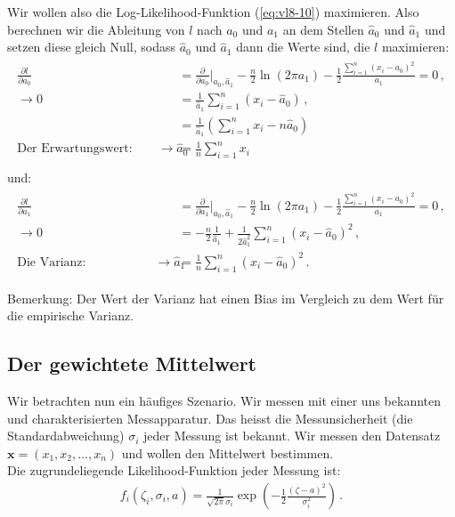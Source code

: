 Wir wollen also die Log-Likelihood-Funktion (\cref{eq:vl8-10}) maximieren. Also berechnen wir die Ableitung von $l$ nach $a_0$ und $a_1$ an dem Stellen $\hat{a}_0$ und $\hat{a}_1$ und setzen diese gleich Null, sodass $\hat{a}_0$ und $\hat{a}_1$ dann die Werte sind, die $l$ maximieren:
\begin{align}
\begin{split}
\frac{ \partial l }{ \partial a_0 } &= \frac{ \partial }{ \partial a_0 } \bigg|_{\hat{a}_0, \hat{a}_1} - \frac{n}{2} \ln{ ( 2 \pi a_1 ) } - \frac{1}{2} \frac{ \sum_{i=1}^n (x_i - a_0)^2 }{ a_1 } = 0\,,\\
\rightarrow 0 &= \frac{1}{ \hat{a}_1} \sum_{i = 1}^n (x_i - \hat{a}_0)\,,\\
&=  \frac{1}{ \hat{a}_1} \left( \sum_{i = 1}^n x_i - n \hat{a}_0 \right)\\
\text{Der Erwartungswert:}\quad \quad \rightarrow \hat{a}_0 &= \frac{1}{n} \sum_{i = 1}^n x_i\\
\label{eq:vl8-11}
\end{split}
\end{align}
und:
\begin{align}
\begin{split}
\frac{ \partial l }{ \partial a_1 } &= \frac{ \partial }{ \partial a_1 } \bigg|_{\hat{a}_0, \hat{a}_1} - \frac{n}{2} \ln{ ( 2 \pi a_1 ) } - \frac{1}{2} \frac{ \sum_{i=1}^n (x_i - a_0)^2 }{ a_1 } = 0\,,\\
\rightarrow 0 &= - \frac{n}{2}\frac{1}{ \hat{a}_1 } + \frac{1}{ 2 \hat{a}_1^2 }\sum_{i = 1}^n (x_i - \hat{a}_0)^2\,,\\
\text{Die Varianz:}\quad \quad \quad \quad \quad \enspace
\rightarrow \hat{a}_1 &= \frac{1}{n} \sum_{i = 1}^n (x_i - \hat{a}_0)^2\,.
\label{eq:vl8-12}
\end{split}
\end{align}

Bemerkung: Der Wert der Varianz hat einen Bias im Vergleich zu dem Wert f\"ur die empirische Varianz.


\subsection{Der gewichtete Mittelwert}
\label{subsec:vl8-3}

Wir betrachten nun ein h\"aufiges Szenario. Wir messen mit einer uns bekannten und charakterisierten Messapparatur. Das heisst die Messunsicherheit (die Standardabweichung) $\sigma_i$ jeder Messung ist bekannt. Wir messen den Datensatz $\boldsymbol{x} = (x_1, x_2, ..., x_n)$ und wollen den Mittelwert bestimmen.\\
Die zugrundeliegende Likelihood-Funktion jeder Messung ist:
\begin{align}
f_i(\zeta_i, \sigma_i, a) = \frac{1}{ \sqrt{2 \pi } \sigma_i} \exp \left( - \frac{1}{2} \frac{ (\zeta - a)^2 }{ \sigma_i^2 } \right)\,.
\label{eq:vl8-13}
\end{align}

